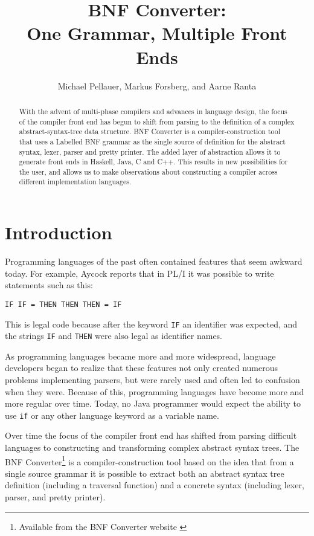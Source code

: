 \documentclass{llncs}
\title{{\Large \bf BNF Converter: \\ One Grammar, Multiple Front Ends}}
\author{Michael Pellauer, Markus Forsberg, and Aarne Ranta}
\institute{%
  Chalmers University of Technology,\\
  Department of Computing Science\\
  SE-412 96 Gothenburg, Sweden,\\
  \texttt{\lbr{}pellauer, markus, aarne\rbr{}@cs.chalmers.se}}
\begin{document}
\maketitle


\begin{abstract}
With the advent of multi-phase compilers and advances in language design, the focus of the compiler front end has begun to shift from parsing to the definition of a complex abstract-syntax-tree data structure. BNF Converter is a compiler-construction tool that uses a Labelled BNF grammar as the single source of definition for the abstract syntax, lexer, parser and pretty printer. The added layer of abstraction allows it to generate front ends in Haskell, Java, C and C++. This results in new possibilities for the user, and allows us to make observations about constructing a compiler across different implementation languages.
\end{abstract}

\section{Introduction}

Programming languages of the past often contained features that seem awkward today. For example, Aycock \cite{horspool} reports that in PL/I it was possible to write statements such as this:
\begin{center}
{\tt IF IF = THEN THEN THEN = IF}
\end{center}
This is legal code because after the keyword {\tt IF}
an identifier was expected, and the strings {\tt IF} and {\tt THEN} 
were also legal as identifier names. 

As programming languages became more and more widespread, language developers began to realize
that these features not only created numerous problems implementing parsers,
but were rarely used and often led to confusion when they were. Because of this, programming languages have become more and more regular over time. Today, no Java programmer would expect the ability to use \texttt{if} or any other language keyword as a variable name.

Over time the focus of the compiler front end has shifted from parsing difficult languages to constructing and transforming complex abstract syntax trees. 
The BNF Converter\footnote{
Available from the BNF Converter website \cite{bnfcsite}
}  
is a compiler-construction tool based on the idea that from a single source grammar it is possible to extract both an abstract syntax tree definition (including a traversal function) and a concrete syntax (including lexer, parser, and pretty printer).
\end{document}
